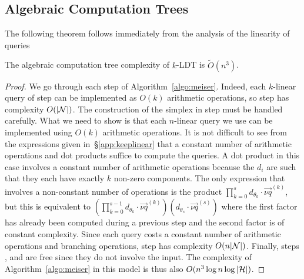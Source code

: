 \subsection{Algebraic Computation Trees}%
\label{app:act}

The following theorem follows immediately from
the analysis of the linearity of queries
\begin{theorem}\label{thm:act}
	The algebraic computation tree complexity of \(k\)-LDT is
	\(\tilde{O}(n^3)\).
\end{theorem}

\begin{proof}
We go through each step of Algorithm~\ref{algo:meiser}.
Indeed, each \(k\)-linear query of step  can be implemented as
\(O(k)\) arithmetic operations, so step  has complexity
\(O(|{\mathcal{N}}|)\).
The construction of the simplex in step  must be handled carefully.
What we need to show is that each \(n\)-linear query we use can be implemented
using $O(k)$ arithmetic operations. It is not difficult to see from the
expressions given in~\S\ref{app:keeplinear} that a constant number of arithmetic
operations and dot products suffice to
compute the queries. A dot product in this case involves a constant number
of arithmetic operations because the \(d_i\) are such that they each have
exactly \(k\) non-zero components. The only expression that involves a
non-constant number of operations is the product \(\prod_{k=0}^{s}
d_{\theta_{k}} \cdot \vec{\nu q}^{(k)}\), but this is equivalent to
\((\prod_{k=0}^{s-1}
	d_{\theta_{k}} \cdot \vec{\nu q}^{(k)})(d_{\theta_{s}} \cdot
	\vec{\nu q}^{(s)})\)
where the first factor has already been computed during a previous step and
the second factor is of constant complexity. Since each query costs a constant
number of arithmetic operations and branching operations, step 
has complexity \(O(n|{\mathcal{N}}|)\).
Finally, steps ,  and  are free since they do not involve the
input.
The complexity of Algorithm~\ref{algo:meiser} in this model is thus also
\(O(n^3 \log n \log |{\mathcal{H}}|)\).
\end{proof}

